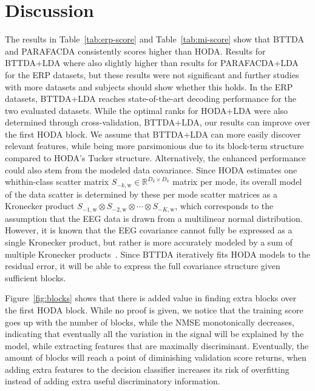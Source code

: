 \documentclass[twocolumn]{article}
\begin{document}
\section{Discussion}
The results in Table~\ref{tab:erp-score} and Table~\ref{tab:mi-score} show
that BTTDA and PARAFACDA consistently scores higher than HODA.
Results for BTTDA+LDA where also slightly higher than results for PARAFACDA+LDA
for the ERP datasets, but these results were not significant and further
studies with more datasets and subjects should show whether this holds.
In the ERP datasets, BTTDA+LDA reaches state-of-the-art decoding performance
for the two evaluated datasets.
While the optimal ranks for HODA+LDA were also determined through
cross-validation, BTTDA+LDA, our results can improve over the first \textsc{HODA} block.
We assume that BTTDA+LDA can more easily discover relevant features, while
being more parsimonious due to its block-term structure compared to HODA's
Tucker structure.
Alternatively, the enhanced performance could also stem from the modeled data
covariance.
Since HODA estimates one whithin-class scatter matrix
$S_{-k,\text{w}}\in\mathbb{R}^{D_k\times D_k}$ matrix per mode, its overall
model of the data scatter is determined by these per mode scatter matrices as a
Kronecker product $S_{-1,\text{w}}\otimes S_{-2,\text{w}}\otimes\cdots\otimes S_{-K,\text{w}}$, which corresponds to the assumption that the EEG data is
drawn from a multilinear normal distribution.
However, it is known that the EEG covariance cannot fully be expressed as a
single Kronecker product, but rather is more accurately modeled by a sum of
multiple Kronecker products~\cite{Bijma2005}.
Since BTTDA iteratively fits HODA models to the residual error, it will be able
to express the full covariance structure given sufficient blocks.


Figure~\ref{fig:blocks} shows that there is added value in finding extra blocks
over the first \textsc{HODA} block.
While no proof is given, we notice that the training score goes up with the
number of blocks, while the NMSE monotonically decreases, indicating that
eventually all the variation in the signal will be explained by the model, while
extracting features that are maximally discriminant.
Eventually, the amount of blocks will reach a point of diminishing validation
score returns, when adding extra features to the decision classifier increases
its risk of overfitting instead of adding extra useful discriminatory
information.
\end{document}
